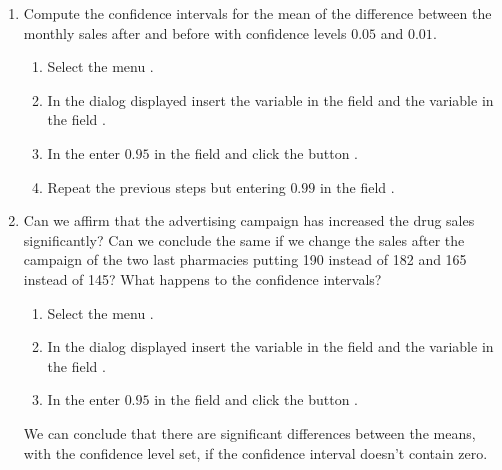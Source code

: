 \begin{enumerate}[leftmargin=*]
\begin{enumerate}
\item Compute the confidence intervals for the mean of the difference between the monthly sales after and before with
confidence levels $0.05$ and $0.01$.
\begin{indication}
\begin{enumerate}
\item Select the menu .
\item In the dialog displayed insert the variable  in the field  and
the variable  in the field .
\item In the  enter $0.95$ in the field  and click the button
.
\item Repeat the previous steps but entering $0.99$ in the field .
\end{enumerate}
\end{indication}

\item Can we affirm that the advertising campaign has increased the drug sales significantly? 
Can we conclude the same if we change the sales after the campaign of the two last pharmacies putting 190 instead of 182
and 165 instead of 145?
What happens to the confidence intervals?
\begin{indication}
\begin{enumerate}
\item Select the menu .
\item In the dialog displayed insert the variable  in the field  and the variable
 in the field .
\item In the  enter $0.95$ in the field  and click the button
.
\end{enumerate}
We can conclude that there are significant differences between the means, with the confidence level set, if the
confidence interval doesn't contain zero. 
\end{indication}
\end{enumerate}



\end{enumerate}
